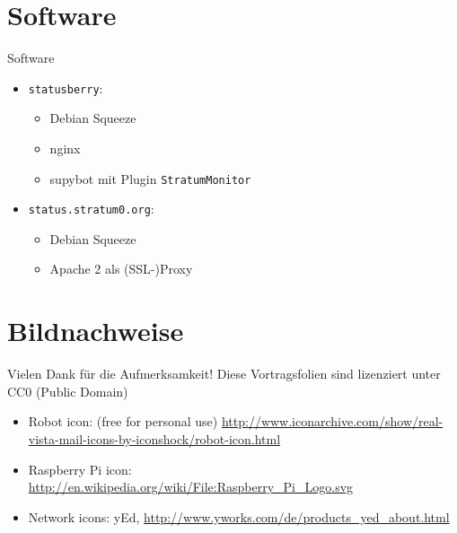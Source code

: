 \documentclass[handout]{beamer}
\begin{document}
\section{Software}
\begin{frame}{Software}
  \begin{itemize}
		\item \texttt{statusberry}:
		\begin{itemize}
			\item Debian Squeeze
			\item nginx
			\item supybot mit Plugin \texttt{StratumMonitor}
		\end{itemize}
		\item \texttt{status.stratum0.org}:
		\begin{itemize}
			\item Debian Squeeze
			\item Apache 2 als (SSL-)Proxy
		\end{itemize}
	\end{itemize}
\end{frame}

\section{Bildnachweise}
\begin{frame}
  \centering
  \vfill
  Vielen Dank für die Aufmerksamkeit!
  \vfill
  {\footnotesize Diese Vortragsfolien sind lizenziert unter CC0 (Public Domain)}
  \vfill
	\begin{itemize}
		\item Robot icon: (free for personal use)
			\url{http://www.iconarchive.com/show/real-vista-mail-icons-by-iconshock/robot-icon.html}
		\item Raspberry Pi icon:
			\url{http://en.wikipedia.org/wiki/File:Raspberry_Pi_Logo.svg}
		\item Network icons: yEd,
			\url{http://www.yworks.com/de/products_yed_about.html}
	\end{itemize}
\end{frame}
\end{document}
